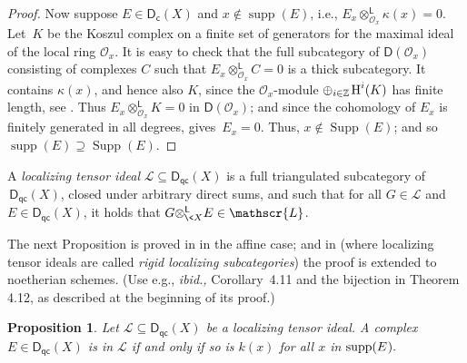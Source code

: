 \documentclass{compositio}
\theoremstyle{plain}
\newtheorem{prop}[thm]{Proposition}
\theoremstyle{definition}
\theoremstyle{remark}
\numberwithin{equation}{thm}
\begin{document}
\begin{proof}
Now suppose $E\in{\boldsymbol{\mathsf{D}}}_{\mathsf{c}}(X)$ and $x\not\in\operatorname{supp}(E)$, i.e., $E_{x} {\otimes^{\mathsf L}_{{{\mathscr{O}}_{x}}}}\kappa(x)=0$.{\vspace{1pt}} Let~$K$ be the Koszul complex on{} a finite set of generators for the maximal ideal of the local ring ${\mathscr{O}}_{x}$. 
It is easy to check{} that the full subcategory of  ${\boldsymbol{\mathsf{D}}}({\mathscr{O}}_{x})$ consisting of complexes $C$ such that $E_{x}{\otimes^{\mathsf L}_{{{\mathscr{O}}_{x}}}}C=0$ is a thick subcategory. It contains $\kappa(x)$, and hence also $K$,{} since the ${\mathscr{O}}_{x}$-module $\oplus_{i\in{\mathbb Z}}{\mkern1mu}{\mkern1mu}\textup{H}^i(K)$
has finite length, see \cite[3.5]{DGI}. Thus{\vspace{1pt}} $E_{x}{\otimes^{\mathsf L}_{{{\mathscr{O}}_{x}}}} K = 0$ in ${\boldsymbol{\mathsf{D}}}({\mathscr{O}}_{x})$; and since the cohomology of $E_{x}$ is finitely generated in all degrees,{} \cite[1.3(2)]{FI}
gives~\mbox{$E_{x}=0$.}  Thus, $x\not\in\operatorname{Supp}(E)$;
and so $\operatorname{supp}(E)\supseteq\operatorname{Supp}(E)$.
\end{proof}

\pagebreak[3]
A \emph{localizing tensor ideal} ${\mathscr{L}}\subseteq{{\boldsymbol{\mathsf{D}}}_{\mathsf{qc}}}(X)$ is a full triangulated subcategory of~$\,{{\boldsymbol{\mathsf{D}}}_{\mathsf{qc}}}(X)$, closed under arbitrary direct sums, and such that for all $G\in{\mathscr{L}}$ and $E\in{{\boldsymbol{\mathsf{D}}}_{\mathsf{qc}}}(X)$, it holds that{\vspace{1pt}}
$G{\otimes^{\mathsf L}_{{{\mkern-1mu}\<X}}}E\in{\mathscr{L}}$.  

The next Proposition is proved in \cite[\S2]{Nm1} in the affine case; and in 
\cite{AJS} (where localizing tensor ideals are called \emph{rigid localizing subcategories}) the proof 
is extended to noetherian schemes. (Use e.g., \emph{ibid.,} Corollary~4.11 and the bijection in Theorem 4.12, as described at the beginning of its proof.){\vspace{1pt}}

\begin{prop}
\label{ideals} 
Let\/ ${\mathscr{L}}\subseteq{{\boldsymbol{\mathsf{D}}}_{\mathsf{qc}}}(X)$ be a localizing tensor ideal. A complex $E\in{{\boldsymbol{\mathsf{D}}}_{\mathsf{qc}}}(X)$ is in\/ ${\mathscr{L}}$ if and only if so is $k(x)$ for all\/ $x$ in $\operatorname{supp}(E{\mkern1mu}).$
\end{prop}
\end{document}
